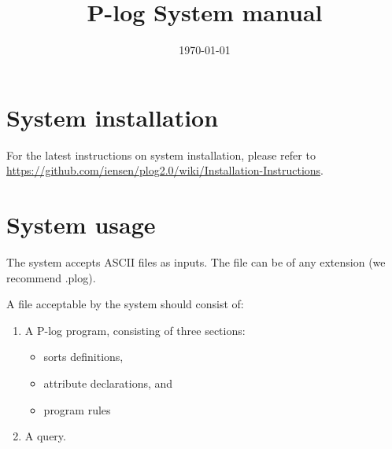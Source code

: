 \documentclass[12pt, letterpaper]{article}
\begin{document}
\newcommand{\hide}[1]{}
\newcommand{\exercise}[1]{}
\newcommand{\future}[1]{}
\newcommand{\otherquestions}[1]{}
\newcommand{\set}[1]{\{#1\}}
\newcommand{\pg}[1]{{\tt #1}}
\newtheorem{definition}{Definition}
\newcommand{\emptyclause}{\Box}
\def\st{\bigskip\noindent}
\newcommand{\lplus}
{
   \stackrel{+}{\gets}
}

\newcommand{\fe}[1] {
  \begin{frame}
    #1
  \end{frame}}

\newcommand{\eoa}{ {\bf End} of algorithm}

\newcommand{\ft}[1] {\frametitle{#1}}

\newcommand{\ie}[1] {
  \begin{itemize}
    #1
  \end{itemize}
}

\newcommand{\ee}[1] {
  \begin{enumerate}
    #1
  \end{enumerate}\label{marker}
}
\newcommand{\blk}[2] {
  \begin{block}{#1}
    #2
  \end{block}
}

\newtheorem{collorary}{Corollary}
\newtheorem{proposition}{Proposition}
\newtheorem{invariant}{Invariant}
\newtheorem{property}{Property}
\newtheorem{claim}{Claim}
\newtheorem{example}{Example}


\title{P-log System manual}
\date{\today}
\maketitle
\tableofcontents
\pagebreak


\section{System installation}

For the latest instructions on system installation, please refer to \url{https://github.com/iensen/plog2.0/wiki/Installation-Instructions}.
\section{System usage}\label{sysusage}

\medskip\noindent
The system accepts ASCII files as inputs.
The file can be of any extension (we recommend .plog).

\medskip\noindent
A file acceptable by the system should consist of:
\begin{enumerate}
\item A P-log program, consisting of three sections:
\begin{itemize}
\item sorts definitions,
\item attribute declarations, and
\item program rules
\end{itemize}
\item A query.
\end{enumerate}
\end{document}
